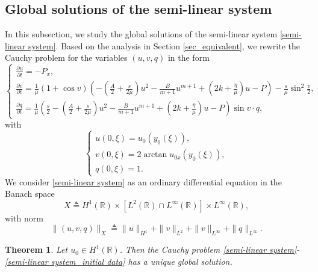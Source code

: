 \documentclass[10pt]{article}
\newtheorem{theo}{Theorem}[section]
\numberwithin{equation}{section}
\begin{document}
	\subsection{Global solutions of the semi-linear system}
	In this subsection, we study the global solutions of the semi-linear system \eqref{semi-linear system}. Based on the analysis in Section \ref{sec_equivalent}, we rewrite the Cauchy problem for the variables $(u,v,q)$ in the form
	\begin{equation}\label{semi-linear system}
		\left\{
		\begin{array}{l}
			\frac{\partial u}{\partial t}=-P_x,\\
			\frac{\partial v}{\partial t}=\frac{1}{\mu}(1+\cos v)\left(-\left(\frac A2+\frac{s}{2\mu}\right)u^2-\frac{B}{m+1}u^{m+1}+\left(2k+\frac{\eta}{\mu}\right)u-P\right)-\frac{s}{\mu}\sin^2\frac{v}{2},\\
			\frac{\partial q}{\partial t}=\frac{1}{\mu}\left(\frac{s}{2}-\left(\frac A2+\frac{s}{2\mu}\right)u^2-\frac{B}{m+1}u^{m+1}+\left(2k+\frac{\eta}{\mu}\right)u-P\right)\sin v\cdot q,
		\end{array}\right.
	\end{equation}
	with
	\begin{equation}\label{semi-linear system_initial data}
		\left\{
		\begin{array}{l}
			u(0,\xi)=u_0\left(y_0(\xi)\right), \\
			v(0,\xi)=2\arctan u_{0x}\left(y_0(\xi)\right), \\
			q(0,\xi)=1.
		\end{array}\right.
	\end{equation}
	We consider \eqref{semi-linear system} as an ordinary differential equation in the Banach space
	\begin{equation*}
		X\triangleq H^1(\mathbb{R})\times\left[L^2(\mathbb{R})\cap L^\infty(\mathbb{R})\right]\times L^\infty(\mathbb{R}),
	\end{equation*}
	with norm
	\begin{equation*}
		\|(u,v,q)\|_X\triangleq\|u\|_{H^1}+\|v\|_{L^2}+\|v\|_{L^\infty}+\|q\|_{L^\infty}.
	\end{equation*}
	\begin{theo}
		Let $u_0\in H^1(\mathbb{R})$. Then the Cauchy problem \eqref{semi-linear system}-\eqref{semi-linear system_initial data} has a unique global solution.
	\end{theo}
\end{document}
